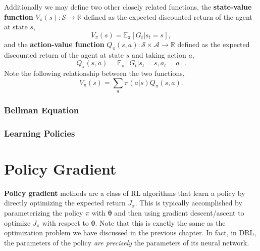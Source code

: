 \documentclass[12pt]{report}
\theoremstyle{definition}
\theoremstyle{remark}
\begin{document}
Additionally we may define two other closely related functions, the \textbf{state-value function} $V_\pi(s): \mathcal{S} \to \mathbb{R}$ defined as the expected discounted return of the agent at state $s$,
\begin{equation}
    V_\pi(s) = \mathbb{E}_\pi[G_t | s_t = s],
\end{equation}
and the \textbf{action-value function} $Q_\pi(s, a): \mathcal{S} \times \mathcal{A} \to \mathbb{R}$ defined as the expected discounted return of the agent at state $s$ and taking action $a$,
\begin{equation}
    Q_\pi(s, a) = \mathbb{E}_\pi[G_t | s_t = s, a_t = a].
\end{equation}
Note the following relationship between the two functions,
\begin{equation}
    V_\pi(s) = \sum_a \pi(a | s) Q_\pi(s, a).
\end{equation}

\subsubsection{Bellman Equation}



\subsubsection{Learning Policies}

\section{Policy Gradient}
\textbf{Policy gradient} methods are a class of RL algorithms that learn a policy by directly optimizing the expected return $J_\pi$. This is typically accomplished by parameterizing the policy $\pi$ with $\boldsymbol{\theta}$ and then using gradient descent/ascent to optimize $J_\pi$ with respect to $\boldsymbol{\theta}$. Note that this is exactly the same as the optimization problem we have discussed in the previous chapter. In fact, in DRL, the parameters of the policy \textit{are precisely} the parameters of its neural network.
\end{document}
